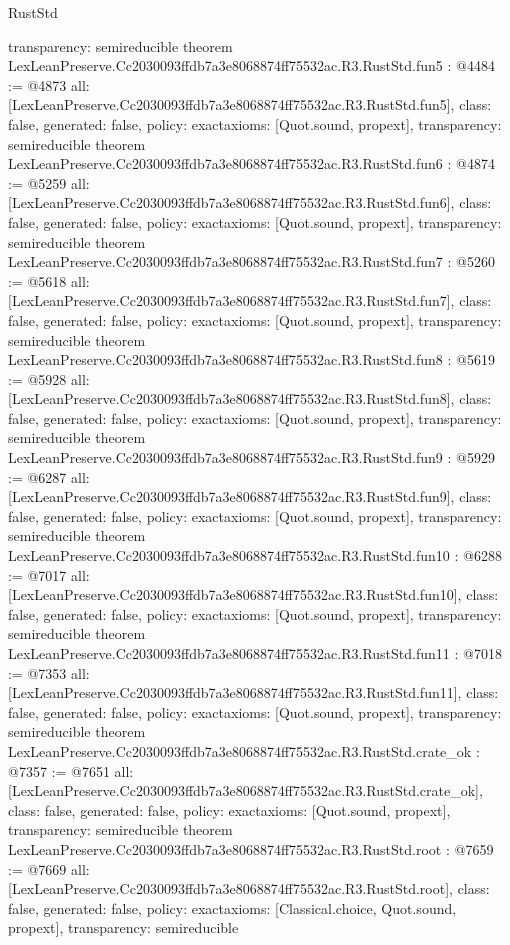 \begin{lexlean}{RustStd}
\begin{coremodule}
{  transparency: semireducible
}
theorem LexLeanPreserve.Cc2030093ffdb7a3e8068874ff75532ac.R3.RustStd.fun5 : @4484 := @4873 {
  all: [LexLeanPreserve.Cc2030093ffdb7a3e8068874ff75532ac.R3.RustStd.fun5],
  class: false,
  generated: false,
  policy: exact{axioms: [Quot.sound, propext]},
  transparency: semireducible
}
theorem LexLeanPreserve.Cc2030093ffdb7a3e8068874ff75532ac.R3.RustStd.fun6 : @4874 := @5259 {
  all: [LexLeanPreserve.Cc2030093ffdb7a3e8068874ff75532ac.R3.RustStd.fun6],
  class: false,
  generated: false,
  policy: exact{axioms: [Quot.sound, propext]},
  transparency: semireducible
}
theorem LexLeanPreserve.Cc2030093ffdb7a3e8068874ff75532ac.R3.RustStd.fun7 : @5260 := @5618 {
  all: [LexLeanPreserve.Cc2030093ffdb7a3e8068874ff75532ac.R3.RustStd.fun7],
  class: false,
  generated: false,
  policy: exact{axioms: [Quot.sound, propext]},
  transparency: semireducible
}
theorem LexLeanPreserve.Cc2030093ffdb7a3e8068874ff75532ac.R3.RustStd.fun8 : @5619 := @5928 {
  all: [LexLeanPreserve.Cc2030093ffdb7a3e8068874ff75532ac.R3.RustStd.fun8],
  class: false,
  generated: false,
  policy: exact{axioms: [Quot.sound, propext]},
  transparency: semireducible
}
theorem LexLeanPreserve.Cc2030093ffdb7a3e8068874ff75532ac.R3.RustStd.fun9 : @5929 := @6287 {
  all: [LexLeanPreserve.Cc2030093ffdb7a3e8068874ff75532ac.R3.RustStd.fun9],
  class: false,
  generated: false,
  policy: exact{axioms: [Quot.sound, propext]},
  transparency: semireducible
}
theorem LexLeanPreserve.Cc2030093ffdb7a3e8068874ff75532ac.R3.RustStd.fun10 : @6288 := @7017 {
  all: [LexLeanPreserve.Cc2030093ffdb7a3e8068874ff75532ac.R3.RustStd.fun10],
  class: false,
  generated: false,
  policy: exact{axioms: [Quot.sound, propext]},
  transparency: semireducible
}
theorem LexLeanPreserve.Cc2030093ffdb7a3e8068874ff75532ac.R3.RustStd.fun11 : @7018 := @7353 {
  all: [LexLeanPreserve.Cc2030093ffdb7a3e8068874ff75532ac.R3.RustStd.fun11],
  class: false,
  generated: false,
  policy: exact{axioms: [Quot.sound, propext]},
  transparency: semireducible
}
theorem LexLeanPreserve.Cc2030093ffdb7a3e8068874ff75532ac.R3.RustStd.crate_ok : @7357 := @7651 {
  all: [LexLeanPreserve.Cc2030093ffdb7a3e8068874ff75532ac.R3.RustStd.crate_ok],
  class: false,
  generated: false,
  policy: exact{axioms: [Quot.sound, propext]},
  transparency: semireducible
}
theorem LexLeanPreserve.Cc2030093ffdb7a3e8068874ff75532ac.R3.RustStd.root : @7659 := @7669 {
  all: [LexLeanPreserve.Cc2030093ffdb7a3e8068874ff75532ac.R3.RustStd.root],
  class: false,
  generated: false,
  policy: exact{axioms: [Classical.choice, Quot.sound, propext]},
  transparency: semireducible
}


\end{coremodule}
\end{lexlean}
